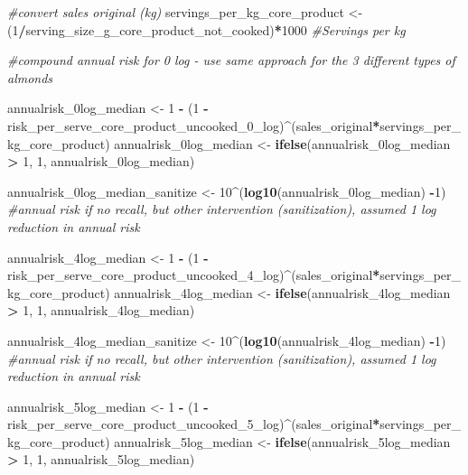 \documentclass[
]{article}
\newenvironment{Shaded}{\begin{snugshade}}{\end{snugshade}}
\newcommand{\CommentTok}[1]{\textcolor[rgb]{0.56,0.35,0.01}{\textit{#1}}}
\newcommand{\DecValTok}[1]{\textcolor[rgb]{0.00,0.00,0.81}{#1}}
\newcommand{\FunctionTok}[1]{\textcolor[rgb]{0.13,0.29,0.53}{\textbf{#1}}}
\newcommand{\NormalTok}[1]{#1}
\newcommand{\OtherTok}[1]{\textcolor[rgb]{0.56,0.35,0.01}{#1}}
\newcommand{\SpecialCharTok}[1]{\textcolor[rgb]{0.81,0.36,0.00}{\textbf{#1}}}
\begin{document}
\begin{Shaded}
\begin{Highlighting}[]
\CommentTok{\#convert sales original (kg)}
\NormalTok{servings\_per\_kg\_core\_product }\OtherTok{\textless{}{-}}\NormalTok{ (}\DecValTok{1}\SpecialCharTok{/}\NormalTok{serving\_size\_g\_core\_product\_not\_cooked)}\SpecialCharTok{*}\DecValTok{1000}   \CommentTok{\#Servings per kg}

\CommentTok{\#compound annual risk for 0 log {-} use same approach for the 3 different types of almonds}

\NormalTok{annualrisk\_0log\_median }\OtherTok{\textless{}{-}} \DecValTok{1} \SpecialCharTok{{-}}\NormalTok{ (}\DecValTok{1} \SpecialCharTok{{-}}\NormalTok{ risk\_per\_serve\_core\_product\_uncooked\_0\_log)}\SpecialCharTok{\^{}}\NormalTok{(sales\_original}\SpecialCharTok{*}\NormalTok{servings\_per\_kg\_core\_product)}
\NormalTok{annualrisk\_0log\_median }\OtherTok{\textless{}{-}} \FunctionTok{ifelse}\NormalTok{(annualrisk\_0log\_median }\SpecialCharTok{\textgreater{}} \DecValTok{1}\NormalTok{, }\DecValTok{1}\NormalTok{, annualrisk\_0log\_median)}

\NormalTok{annualrisk\_0log\_median\_sanitize }\OtherTok{\textless{}{-}} \DecValTok{10}\SpecialCharTok{\^{}}\NormalTok{(}\FunctionTok{log10}\NormalTok{(annualrisk\_0log\_median) }\SpecialCharTok{{-}}\DecValTok{1}\NormalTok{) }\CommentTok{\#annual risk if no recall, but other intervention (sanitization), assumed 1 log reduction in annual risk}

\NormalTok{annualrisk\_4log\_median }\OtherTok{\textless{}{-}} \DecValTok{1} \SpecialCharTok{{-}}\NormalTok{ (}\DecValTok{1} \SpecialCharTok{{-}}\NormalTok{ risk\_per\_serve\_core\_product\_uncooked\_4\_log)}\SpecialCharTok{\^{}}\NormalTok{(sales\_original}\SpecialCharTok{*}\NormalTok{servings\_per\_kg\_core\_product)}
\NormalTok{annualrisk\_4log\_median }\OtherTok{\textless{}{-}} \FunctionTok{ifelse}\NormalTok{(annualrisk\_4log\_median }\SpecialCharTok{\textgreater{}} \DecValTok{1}\NormalTok{, }\DecValTok{1}\NormalTok{, annualrisk\_4log\_median)}

\NormalTok{annualrisk\_4log\_median\_sanitize }\OtherTok{\textless{}{-}} \DecValTok{10}\SpecialCharTok{\^{}}\NormalTok{(}\FunctionTok{log10}\NormalTok{(annualrisk\_4log\_median) }\SpecialCharTok{{-}}\DecValTok{1}\NormalTok{) }\CommentTok{\#annual risk if no recall, but other intervention (sanitization), assumed 1 log reduction in annual risk}

\NormalTok{annualrisk\_5log\_median }\OtherTok{\textless{}{-}} \DecValTok{1} \SpecialCharTok{{-}}\NormalTok{ (}\DecValTok{1} \SpecialCharTok{{-}}\NormalTok{ risk\_per\_serve\_core\_product\_uncooked\_5\_log)}\SpecialCharTok{\^{}}\NormalTok{(sales\_original}\SpecialCharTok{*}\NormalTok{servings\_per\_kg\_core\_product)}
\NormalTok{annualrisk\_5log\_median }\OtherTok{\textless{}{-}} \FunctionTok{ifelse}\NormalTok{(annualrisk\_5log\_median }\SpecialCharTok{\textgreater{}} \DecValTok{1}\NormalTok{, }\DecValTok{1}\NormalTok{, annualrisk\_5log\_median)}


\end{Highlighting}
\end{Shaded}
\end{document}
